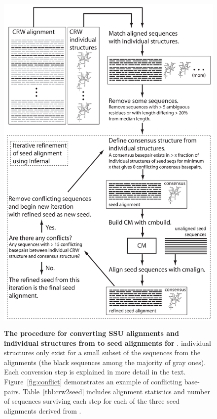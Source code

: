 \begin{figure}
  \begin{center}
\includegraphics[height=6.9in]{Figures/crw2seed-schematic}
        \caption[The procedure for converting SSU alignments and
          individual structures from  to seed alignments for
          .]  {\textbf{The procedure for converting
            SSU alignments and individual structures from  to seed
            alignments for }.  individual structures
          only exist for a small subset of the sequences from the 
          alignments (the black sequences among the majority of gray
          ones). Each conversion step is explained
          in more detail in the text. 
          Figure~\ref{fig:conflict}
          demonstrates an example of conflicting base-pairs. 
          Table~\ref{tbl:crw2seed} includes alignment
          statistics and number of sequences surviving each step for
          each of the three seed alignments derived from .}
  \end{center}
\label{fig:crw2seed}
\end{figure}

